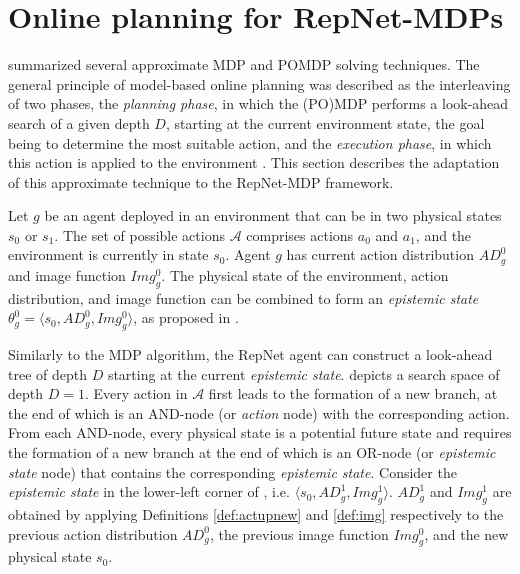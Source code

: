 \section{Online planning for RepNet-MDPs}
\label{sec:onlineplan}

 summarized several approximate MDP and POMDP solving techniques. The general principle of model-based online planning was described as the interleaving of two phases, the \textit{planning phase}, in which the (PO)MDP performs a look-ahead search of a given depth $D$, starting at the current environment state, the goal being to determine the most suitable action, and the \textit{execution phase}, in which this action is applied to the environment \cite{offlineonline}. This section describes the adaptation of this approximate technique to the RepNet-MDP framework.

Let $g$ be an agent deployed in an environment that can be in two physical states $s_0$ or $s_1$. The set of possible actions $\mathcal{A}$ comprises actions $a_0$ and $a_1$, and the environment is currently in state $s_0$. Agent $g$ has current action distribution $AD_g^0$ and image function $Img_g^0$. The physical state of the environment, action distribution, and image function can be combined to form an \textit{epistemic state} $\theta_g^0 = \langle s_0, AD_g^0, Img_g^0 \rangle$, as proposed in .

Similarly to the MDP algorithm, the RepNet agent can construct a look-ahead tree of depth $D$ starting at the current \textit{epistemic state}.  depicts a search space of depth $D = 1$. Every action in $\mathcal{A}$ first leads to the formation of a new branch, at the end of which is an AND-node (or \textit{action} node) with the corresponding action. From each AND-node, every physical state is a potential future state and requires the formation of a new branch at the end of which is an OR-node (or \textit{epistemic state} node) that contains the corresponding \textit{epistemic state}. Consider the \textit{epistemic state} in the lower-left corner of , i.e. $\langle s_0, AD_g^1, Img_g^1 \rangle$. $AD_g^1$ and $Img_g^1$ are obtained by applying Definitions \ref{def:actupnew} and \ref{def:img} respectively to the previous action distribution $AD_g^0$, the previous image function $Img_g^0$, and the new physical state $s_0$. 

